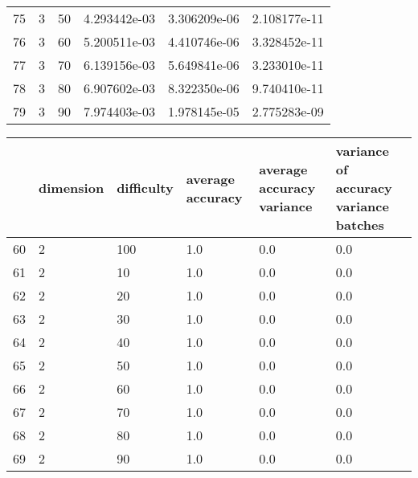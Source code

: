\documentclass{article}
\begin{document}
\begin{center}
\begin{tabular}{llllll}
75 &         3 &         50 &  4.293442e-03 &          3.306209e-06 &                      2.108177e-11 \\
76 &         3 &         60 &  5.200511e-03 &          4.410746e-06 &                      3.328452e-11 \\
77 &         3 &         70 &  6.139156e-03 &          5.649841e-06 &                      3.233010e-11 \\
78 &         3 &         80 &  6.907602e-03 &          8.322350e-06 &                      9.740410e-11 \\
79 &         3 &         90 &  7.974403e-03 &          1.978145e-05 &                      2.775283e-09 \\
\bottomrule
\end{tabular}
\end{center}
\begin{center}
\begin{tabular}{llllll}
\toprule
{} & dimension & difficulty & average accuracy & average accuracy variance & variance of accuracy variance batches \\
\midrule
60 &         2 &        100 &              1.0 &                       0.0 &                                   0.0 \\
61 &         2 &         10 &              1.0 &                       0.0 &                                   0.0 \\
62 &         2 &         20 &              1.0 &                       0.0 &                                   0.0 \\
63 &         2 &         30 &              1.0 &                       0.0 &                                   0.0 \\
64 &         2 &         40 &              1.0 &                       0.0 &                                   0.0 \\
65 &         2 &         50 &              1.0 &                       0.0 &                                   0.0 \\
66 &         2 &         60 &              1.0 &                       0.0 &                                   0.0 \\
67 &         2 &         70 &              1.0 &                       0.0 &                                   0.0 \\
68 &         2 &         80 &              1.0 &                       0.0 &                                   0.0 \\
69 &         2 &         90 &              1.0 &                       0.0 &                                   0.0 \\

\end{tabular}
\end{center}
\end{document}
